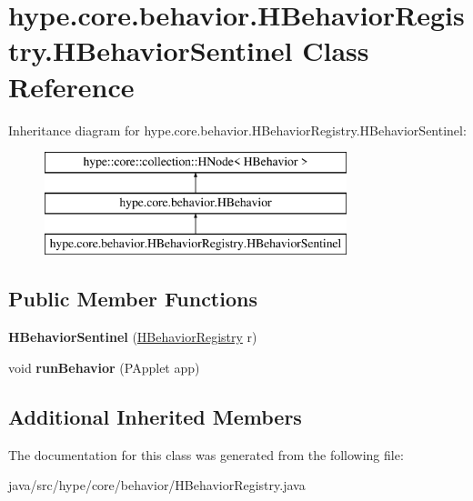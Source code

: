 \hypertarget{classhype_1_1core_1_1behavior_1_1_h_behavior_registry_1_1_h_behavior_sentinel}{\section{hype.\-core.\-behavior.\-H\-Behavior\-Registry.\-H\-Behavior\-Sentinel Class Reference}
\label{classhype_1_1core_1_1behavior_1_1_h_behavior_registry_1_1_h_behavior_sentinel}
}
Inheritance diagram for hype.\-core.\-behavior.\-H\-Behavior\-Registry.\-H\-Behavior\-Sentinel\-:\begin{figure}[H]
\begin{center}
\leavevmode
\includegraphics[height=3.000000cm]{classhype_1_1core_1_1behavior_1_1_h_behavior_registry_1_1_h_behavior_sentinel}
\end{center}
\end{figure}
\subsection*{Public Member Functions}
\begin{DoxyCompactItemize}
\item 
\hypertarget{classhype_1_1core_1_1behavior_1_1_h_behavior_registry_1_1_h_behavior_sentinel_a932019e4f019b4742c020862757b4e80}{{\bfseries H\-Behavior\-Sentinel} (\hyperlink{classhype_1_1core_1_1behavior_1_1_h_behavior_registry}{H\-Behavior\-Registry} r)}\label{classhype_1_1core_1_1behavior_1_1_h_behavior_registry_1_1_h_behavior_sentinel_a932019e4f019b4742c020862757b4e80}

\item 
\hypertarget{classhype_1_1core_1_1behavior_1_1_h_behavior_registry_1_1_h_behavior_sentinel_aa8c199262ed7eeaca77d9ad9b789ed70}{void {\bfseries run\-Behavior} (P\-Applet app)}\label{classhype_1_1core_1_1behavior_1_1_h_behavior_registry_1_1_h_behavior_sentinel_aa8c199262ed7eeaca77d9ad9b789ed70}

\end{DoxyCompactItemize}
\subsection*{Additional Inherited Members}


The documentation for this class was generated from the following file\-:\begin{DoxyCompactItemize}
\item 
java/src/hype/core/behavior/H\-Behavior\-Registry.\-java\end{DoxyCompactItemize}
